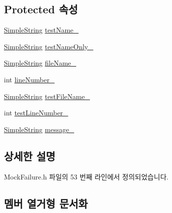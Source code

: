 \subsection*{Protected 속성}
\begin{DoxyCompactItemize}
\item 
\hyperlink{class_simple_string}{Simple\+String} \hyperlink{class_test_failure_afb42d7601608c3597c5279ddaf87e9d6}{test\+Name\+\_\+}
\item 
\hyperlink{class_simple_string}{Simple\+String} \hyperlink{class_test_failure_a60a0b2466b44483497e83d73b70241f2}{test\+Name\+Only\+\_\+}
\item 
\hyperlink{class_simple_string}{Simple\+String} \hyperlink{class_test_failure_a58b6159b0aa3b9775be67920baef742c}{file\+Name\+\_\+}
\item 
int \hyperlink{class_test_failure_ab83f5a7389dae9b8045aa6fbf55b153a}{line\+Number\+\_\+}
\item 
\hyperlink{class_simple_string}{Simple\+String} \hyperlink{class_test_failure_a19c231b59846532ec9d7ac8725886d67}{test\+File\+Name\+\_\+}
\item 
int \hyperlink{class_test_failure_abb1f7af8e12fc84b16898aa5b410ba2a}{test\+Line\+Number\+\_\+}
\item 
\hyperlink{class_simple_string}{Simple\+String} \hyperlink{class_test_failure_af95aeab689fdb637c3e94b0c10db3e53}{message\+\_\+}
\end{DoxyCompactItemize}


\subsection{상세한 설명}


Mock\+Failure.\+h 파일의 53 번째 라인에서 정의되었습니다.



\subsection{멤버 열거형 문서화}
